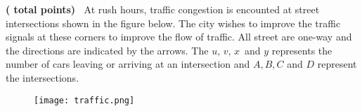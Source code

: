 \documentclass[12pt]{exam}
\begin{document}
\begin{questions}
\newpage
\question
\textbf{( total points)} $\ $
At rush hours, traffic congestion is encounted at street intersections shown in the figure below. The city wishes to improve the traffic signals at these corners to improve the flow of traffic. All street are one-way and the directions are indicated by the arrows. The $u,\,v,\,x\,$ and $y$ represents the number of cars leaving or arriving at an intersection and $A,B,C $ and $D$ represent the intersections.
\begin{figure}[h!]
	\centering
	\texttt{[image: traffic.png]}
\end{figure}
\end{questions}
\end{document}
